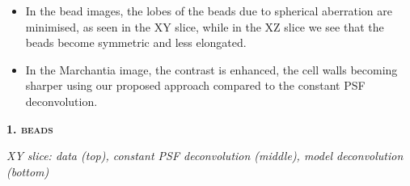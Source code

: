 \documentclass[a0paper,portrait,fontscale=0.35]{baposter}
\newcommand{\mycaption}[1]{
  {
    \smaller
    \emph{#1}
  }
}
\theoremstyle{plain}
\theoremstyle{plain}
\theoremstyle{definition}
\theoremstyle{plain}
\theoremstyle{definition}
\begin{document}
\begin{poster}
{\begin{minipage}[t]{0.33\textwidth}
    \begin{itemize}
      \item In the bead images, the lobes of the beads 
        due to spherical aberration are minimised, as seen
        in the XY slice, while in the XZ slice we see that
        the beads become symmetric and less elongated.

      \item In the Marchantia image, the contrast is 
        enhanced, the cell walls becoming sharper 
        using our proposed approach compared to the constant
        PSF deconvolution.
    \end{itemize}

  \end{minipage}
  \begin{minipage}[t]{0.33\textwidth} 
    \begin{center}
      \larger
      \textbf{\textsc{1. beads}}
    \end{center}

    \vspace{-0.5em}
    \centering
    \begin{minipage}[t]{0.85\textwidth}
      \centering

      \vspace{-1em}
      \begin{center}
        \mycaption{
          XY slice: 
          data (top), constant PSF deconvolution (middle),
          model deconvolution (bottom)
        }
      \end{center}


\end{minipage}
\end{minipage}}
\end{poster}
\end{document}
